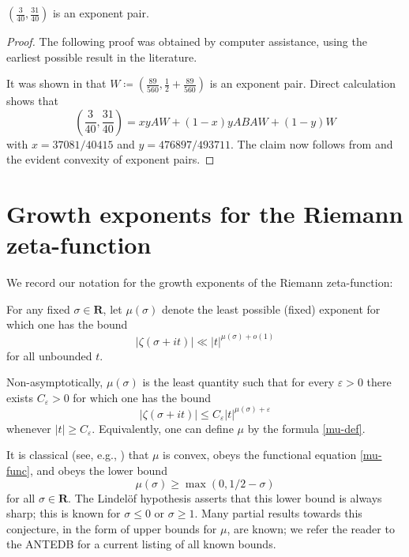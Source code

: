 \documentclass[a4paper, 10pt]{amsart}
\newcommand{\eps}{\varepsilon}
\newcommand{\R}{\mathbf{R}}
\begin{document}
\begin{theorem}\label{old-exp-pair} $(\frac{3}{40}, \frac{31}{40})$ is an exponent pair.
\end{theorem}

\begin{proof} The following proof was obtained by computer assistance, using the earliest possible result in the literature.

It was shown in \cite{watt_exponential_1989} that $W \coloneqq (\frac{89}{560}, \frac{1}{2} + \frac{89}{560})$ is an exponent pair.  Direct calculation shows that
$$ \left(\frac{3}{40}, \frac{31}{40}\right) = xy AW + (1-x)y ABAW + (1-y) W$$
with $x = 37081/40415$ and $y = 476897/493711$.  The claim now follows from  and the evident convexity of exponent pairs.
\end{proof}


\section{Growth exponents for the Riemann zeta-function}

We record our notation for the growth exponents of the Riemann zeta-function:

\begin{definition}\label{zeta-grow-def}  For any fixed $\sigma \in \R$, let $\mu(\sigma)$ denote the least possible (fixed) exponent for which one has the bound
    $$ |\zeta(\sigma+it)| \ll |t|^{\mu(\sigma)+o(1)}$$
    for all unbounded $t$.
\end{definition}

Non-asymptotically, $\mu(\sigma)$ is the least quantity such that for every $\eps>0$ there exists $C_\eps>0$ for which one has the bound
$$ |\zeta(\sigma+it)| \leq C_\eps |t|^{\mu(\sigma)+\eps}$$
whenever $|t| \geq C_\eps$.  Equivalently, one can define $\mu$ by the formula \eqref{mu-def}.

It is classical (see, e.g., \cite[Chapter 5]{titchmarsh_theory_1986}) that $\mu$ is convex, obeys the functional equation \eqref{mu-func}, and obeys the lower bound
$$
\mu(\sigma) \geq \max(0, 1/2-\sigma)
$$
for all $\sigma \in \R$.  The Lindel\"of hypothesis asserts that this lower bound is always sharp; this is known for $\sigma \leq 0$ or $\sigma \geq 1$.  Many partial results towards this conjecture, in the form of upper bounds for $\mu$, are known; we refer the reader to the ANTEDB for a current listing of all known bounds.
\end{document}
